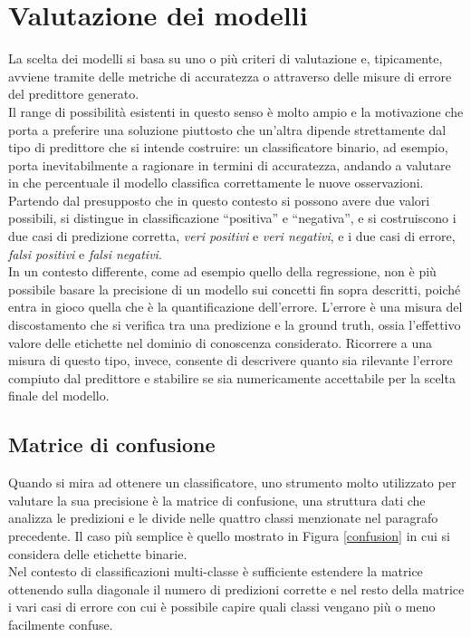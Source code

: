 \documentclass[12pt]{report}
\theoremstyle{definition}
\begin{document}
\section{Valutazione dei modelli}\label{evaluation}
La scelta dei modelli si basa su uno o più criteri di valutazione e, tipicamente, avviene tramite delle metriche di accuratezza o attraverso delle misure di errore del predittore generato.
\\
Il range di possibilità esistenti in questo senso è molto ampio e la motivazione che porta a preferire una soluzione piuttosto che un'altra dipende strettamente dal tipo di predittore che si intende costruire: un classificatore binario, ad esempio, porta inevitabilmente a ragionare in termini di accuratezza, andando a valutare in che percentuale il modello classifica correttamente le nuove osservazioni.
Partendo dal presupposto che in questo contesto si possono avere due valori possibili, si distingue in classificazione ``positiva'' e ``negativa'', e si costruiscono i due casi di predizione corretta, \textit{veri positivi} e \textit{veri negativi}, e i due casi di errore, \textit{falsi positivi} e \textit{falsi negativi}.
\\
In un contesto differente, come ad esempio quello della regressione, non è più possibile basare la precisione di un modello sui concetti fin sopra descritti, poiché entra in gioco quella che è la quantificazione dell'errore. L'errore è una misura del discostamento che si verifica tra una predizione e la ground truth, ossia l'effettivo valore delle etichette nel dominio di conoscenza considerato.
Ricorrere a una misura di questo tipo, invece, consente di descrivere quanto sia rilevante l'errore compiuto dal predittore e stabilire se sia numericamente accettabile per la scelta finale del modello.

\subsection{Matrice di confusione}
Quando si mira ad ottenere un classificatore, uno strumento molto utilizzato per valutare la sua precisione è la matrice di confusione, una struttura dati che analizza le predizioni e le divide nelle quattro classi menzionate nel paragrafo precedente. 
Il caso più semplice è quello mostrato in Figura \ref{confusion} in cui si considera delle etichette binarie.
\\
Nel contesto di classificazioni multi-classe è sufficiente estendere la matrice ottenendo sulla diagonale il numero di predizioni corrette e nel resto della matrice i vari casi di errore con cui è possibile capire quali classi vengano più o meno facilmente confuse. 
\end{document}
